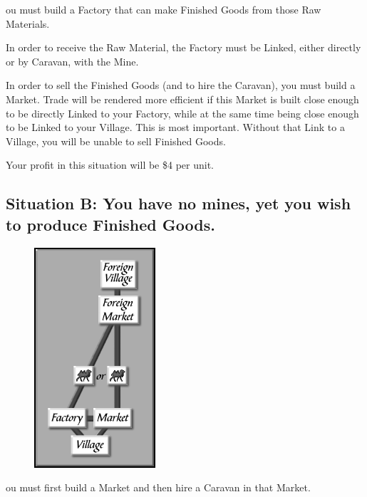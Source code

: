 ou must build a Factory that can make Finished Goods from those Raw Materials.

In order to receive the Raw Material, the Factory must be Linked, either directly or by Caravan, with the Mine.


In order to sell the Finished Goods (and to hire the Caravan), you must build a Market. Trade will be rendered more efficient if this Market is built close enough to be directly Linked to your Factory, while at the same time being close enough to be Linked to your Village. This is most important. Without that Link to a Village, you will be unable to sell Finished Goods.

Your profit in this situation will be \$4 per unit.

\subsection{\textsf{Situation B: You have no mines, yet you wish to produce Finished Goods.}}

\begin{figure}
    \vspace{-20pt}
    \begin{center}
        \includegraphics[width=0.4\textwidth]{Itradesit2} %
    \end{center}
    \vspace{-20pt}
\end{figure}

ou must first build a Market and then hire a Caravan in that Market.

